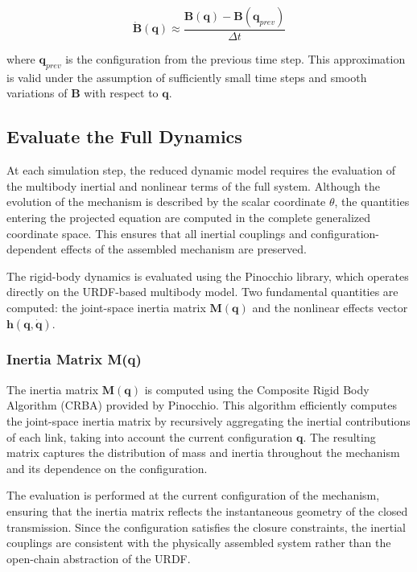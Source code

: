 \begin{equation*}
    \dot{\textbf{B}}(\textbf{q}) \approx \frac{\textbf{B}(\textbf{q}) - \textbf{B}(\textbf{q}_{prev})}{\Delta t}    
\end{equation*}

where $\textbf{q}_{prev}$ is the configuration from the previous time step. This approximation is valid under the assumption of sufficiently small time steps and smooth variations of $\textbf{B}$ with respect to $\textbf{q}$.

\subsection{Evaluate the Full Dynamics}
At each simulation step, the reduced dynamic model requires the evaluation of the multibody inertial and nonlinear terms of the full system. Although the evolution of the mechanism is described by the scalar coordinate $\theta$, the quantities entering the projected equation are computed in the complete generalized coordinate space. This ensures that all inertial couplings and configuration-dependent effects of the assembled mechanism are preserved.

The rigid-body dynamics is evaluated using the Pinocchio library, which operates directly on the URDF-based multibody model. Two fundamental quantities are computed: the joint-space inertia matrix $\textbf{M}(\textbf{q})$ and the nonlinear effects vector $\textbf{h}(\textbf{q},\dot{\textbf{q}})$.

\subsubsection*{Inertia Matrix M(q)}
The inertia matrix $\textbf{M}(\textbf{q})$ is computed using the Composite Rigid Body Algorithm (CRBA) provided by Pinocchio. This algorithm efficiently computes the joint-space inertia matrix by recursively aggregating the inertial contributions of each link, taking into account the current configuration $\textbf{q}$. The resulting matrix captures the distribution of mass and inertia throughout the mechanism and its dependence on the configuration.

The evaluation is performed at the current configuration of the mechanism, ensuring that the inertia matrix reflects the instantaneous geometry of the closed transmission. Since the configuration satisfies the closure constraints, the inertial couplings are consistent with the physically assembled system rather than the open-chain abstraction of the URDF.

